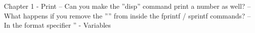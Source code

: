 Chapter 1
- Print
-- Can you make the ''disp'' command print a number as well?
-- What happens if you remove the ''\n'' from inside the fprintf / sprintf commands?
-- In the format specifier ''%
- Variables
